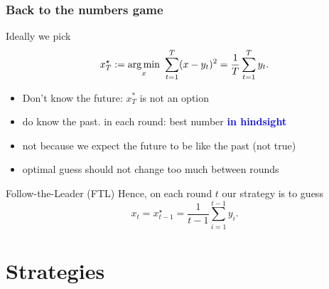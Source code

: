 \documentclass{beamer}
\begin{document}
\begin{frame}
  \frametitle{Back to the numbers game}
  Ideally we pick
  \[
    x^\star_T := \operatorname*{arg\,min}_{x} \ \sum_{t=1}^T (x - y_t)^2 = \frac{1}{T} \sum_{t=1}^T y_t.
  \]
  \begin{itemize}
    \item Don't know the future: $x^*_T$ is not an option
    \item do know the past. in each round: best number \textcolor{blue}{\textbf{in hindsight}}
    \item not because we expect the future to be like the past (not true)
    \item optimal guess should not change too much between rounds
  \end{itemize}
  \begin{block}{Follow-the-Leader (FTL)}
    Hence, on each round $t$ our strategy is to guess
    \begin{equation}
      x_t = x_{t-1}^\star=\frac{1}{t-1} \sum_{i=1}^{t-1} y_i.
    \end{equation}
  \end{block}
\end{frame}


\section{Strategies}%
\label{sec:}
\end{document}
